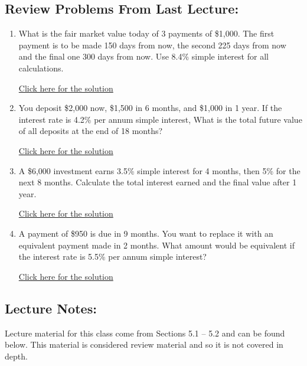 \documentclass[
]{book}
\providecommand{\tightlist}{%
  \setlength{\itemsep}{0pt}\setlength{\parskip}{0pt}}
\begin{document}
\subsection*{Review Problems From Last Lecture:}\label{review-problems-from-last-lecture-8}

\begin{enumerate}
\def\labelenumi{\arabic{enumi}.}
\tightlist
\item
  What is the fair market value today of 3 payments of \$1,000. The first payment is to be made 150 days from now, the second 225 days from now and the final one 300 days from now. Use 8.4\% simple interest for all calculations.

  \href{https://youtu.be/SQhAIwiVOwc}{Click here for the solution}
\item
  You deposit \$2,000 now, \$1,500 in 6 months, and \$1,000 in 1 year. If the interest rate is 4.2\% per annum simple interest, What is the total future value of all deposits at the end of 18 months?

  \href{https://youtu.be/2wadK5_GH5E}{Click here for the solution}
\item
  A \$6,000 investment earns 3.5\% simple interest for 4 months, then 5\% for the next 8 months. Calculate the total interest earned and the final value after 1 year.

  \href{https://youtu.be/xhKMpIKqCFA}{Click here for the solution}
\item
  A payment of \$950 is due in 9 months. You want to replace it with an equivalent payment made in 2 months. What amount would be equivalent if the interest rate is 5.5\% per annum simple interest?

  \href{https://youtu.be/zzLoWKDcHYc}{Click here for the solution}
\end{enumerate}

\subsection*{Lecture Notes:}\label{lecture-notes-9}

Lecture material for this class come from Sections 5.1 -- 5.2 and can be found below. This material is considered review material and so it is not covered in depth.
\end{document}
